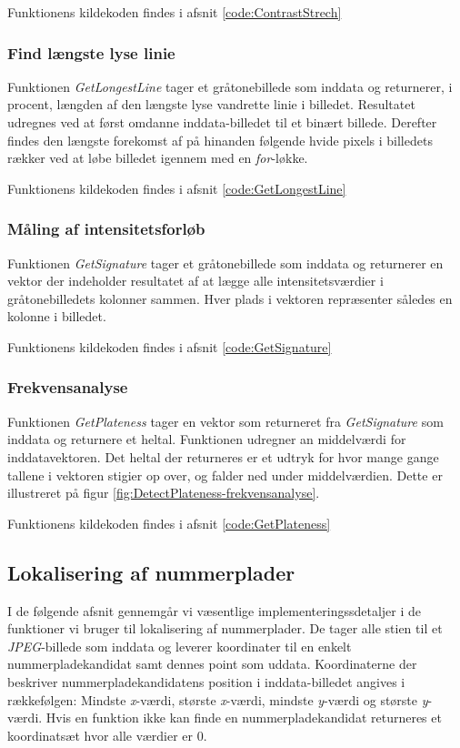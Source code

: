 Funktionens kildekoden findes i afsnit \vref{code:ContrastStrech}

\subsubsection{Find længste lyse linie}
\label{sec:imp:GetLongestLine}
Funktionen \textit{GetLongestLine} tager et gråtonebillede som inddata og returnerer, i procent, længden af den længste lyse vandrette linie i billedet. Resultatet udregnes ved at først omdanne inddata-billedet til et binært billede. Derefter findes den længste forekomst af på hinanden følgende hvide pixels i billedets rækker ved at løbe billedet igennem med en \textit{for}-løkke.  

Funktionens kildekoden findes i afsnit \vref{code:GetLongestLine}

\subsubsection{Måling af intensitetsforløb}
\label{sec:imp:GetSignature}
Funktionen \textit{GetSignature} tager et gråtonebillede som inddata og returnerer en vektor der indeholder resultatet af at lægge alle intensitetsværdier i gråtonebilledets kolonner sammen. Hver plads i vektoren repræsenter således en kolonne i billedet.

Funktionens kildekoden findes i afsnit \vref{code:GetSignature}

\subsubsection{Frekvensanalyse}
\label{sec:imp:GetPlateness}
Funktionen \textit{GetPlateness} tager en vektor som returneret fra \textit{GetSignature} som inddata og returnere et heltal. Funktionen udregner an middelværdi for inddatavektoren. Det heltal der returneres er et udtryk for hvor mange gange tallene i vektoren stigier op over, og falder ned under middelværdien. Dette er illustreret på figur \vref{fig:DetectPlateness-frekvensanalyse}.

Funktionens kildekoden findes i afsnit \vref{code:GetPlateness}


\subsection{Lokalisering af nummerplader}
I de følgende afsnit gennemgår vi væsentlige implementeringssdetaljer i de funktioner vi bruger til lokalisering af nummerplader. De tager alle stien til et \textit{JPEG}-billede som inddata og leverer koordinater til en enkelt nummerpladekandidat samt dennes point som uddata. Koordinaterne der beskriver nummerpladekandidatens position i inddata-billedet angives i rækkefølgen: Mindste \textit{x}-værdi, største \textit{x}-værdi, mindste \textit{y}-værdi og største \textit{y}-værdi. Hvis en funktion ikke kan finde en nummerpladekandidat returneres et koordinatsæt hvor alle værdier er $0$.

